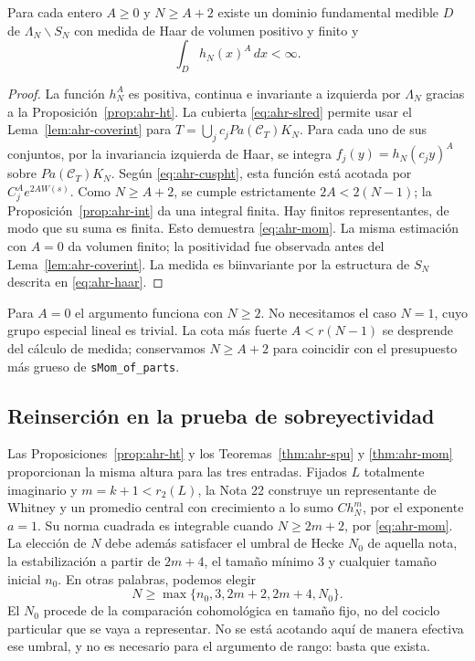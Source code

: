 \begin{teorema}
\label{thm:ahr-mom}
Para cada entero $A\ge0$ y $N\ge A+2$ existe un dominio fundamental medible $D$ de $\Lambda_N\backslash S_N$ con medida de Haar de volumen positivo y finito y
\begin{equation}
 \int_D h_N(x)^A\,dx<\infty.
 \label{eq:ahr-mom}
\end{equation}
\end{teorema}
\begin{proof}
La función $h_N^A$ es positiva, continua e invariante a izquierda por $\Lambda_N$ gracias a la Proposición~\ref{prop:ahr-ht}. La cubierta \eqref{eq:ahr-slred} permite usar el Lema~\ref{lem:ahr-coverint} para $T=\bigcup_j c_j P a(\mathcal C_T)K_N$. Para cada uno de sus conjuntos, por la invariancia izquierda de Haar, se integra $f_j(y)=h_N(c_jy)^A$ sobre $P a(\mathcal C_T)K_N$. Según \eqref{eq:ahr-cuspht}, esta función está acotada por $C_j^A e^{2AW(s)}$. Como $N\ge A+2$, se cumple estrictamente $2A<2(N-1)$; la Proposición~\ref{prop:ahr-int} da una integral finita. Hay finitos representantes, de modo que su suma es finita. Esto demuestra \eqref{eq:ahr-mom}. La misma estimación con $A=0$ da volumen finito; la positividad fue observada antes del Lema~\ref{lem:ahr-coverint}. La medida es biinvariante por la estructura de $S_N$ descrita en \eqref{eq:ahr-haar}.
\end{proof}

Para $A=0$ el argumento funciona con $N\ge2$. No necesitamos el caso $N=1$, cuyo grupo especial lineal es trivial. La cota más fuerte $A<r(N-1)$ se desprende del cálculo de medida; conservamos $N\ge A+2$ para coincidir con el presupuesto más grueso de \texttt{sMom\_of\_parts}.

\subsection{Reinserción en la prueba de sobreyectividad}

Las Proposiciones~\ref{prop:ahr-ht} y los Teoremas~\ref{thm:ahr-spu} y \ref{thm:ahr-mom} proporcionan la misma altura para las tres entradas. Fijados $L$ totalmente imaginario y $m=k+1<r_2(L)$, la Nota 22 construye un representante de Whitney y un promedio central con crecimiento a lo sumo $C h_N^m$, por el exponente $a=1$. Su norma cuadrada es integrable cuando $N\ge2m+2$, por \eqref{eq:ahr-mom}. La elección de $N$ debe además satisfacer el umbral de Hecke $N_0$ de aquella nota, la estabilización a partir de $2m+4$, el tamaño mínimo $3$ y cualquier tamaño inicial $n_0$. En otras palabras, podemos elegir
\begin{equation}
 N\ge\max\{n_0,3,2m+2,2m+4,N_0\}.
 \label{eq:ahr-umbral}
\end{equation}
El $N_0$ procede de la comparación cohomológica en tamaño fijo, no del cociclo particular que se vaya a representar. No se está acotando aquí de manera efectiva ese umbral, y no es necesario para el argumento de rango: basta que exista.

